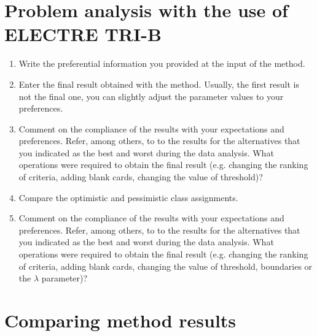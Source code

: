 \documentclass{article}
\begin{document}

\clearpage
\section{Problem analysis with the use of ELECTRE TRI-B}

\begin{enumerate}

    \item Write the preferential information you provided at the input of the method.

    \item Enter the final result obtained with the method. Usually, the first result is not the final one, you can
    slightly adjust the parameter values to your preferences.

    \item Comment on the compliance of the results with your expectations and preferences. Refer, among
    others, to to the results for the alternatives that you indicated as the best and worst during the data
    analysis. What operations were required to obtain the final result (e.g. changing the ranking of criteria,
    adding blank cards, changing the value of threshold)?

    \item Compare the optimistic and pessimistic class assignments.

    \item Comment on the compliance of the results with your expectations and preferences. Refer, among
    others, to to the results for the alternatives that you indicated as the best and worst during the data
    analysis. What operations were required to obtain the final result (e.g. changing the ranking of criteria,
    adding blank cards, changing the value of threshold, boundaries or the $\lambda$ parameter)?

\end{enumerate}

\clearpage
\section{Comparing method results}
\end{document}

